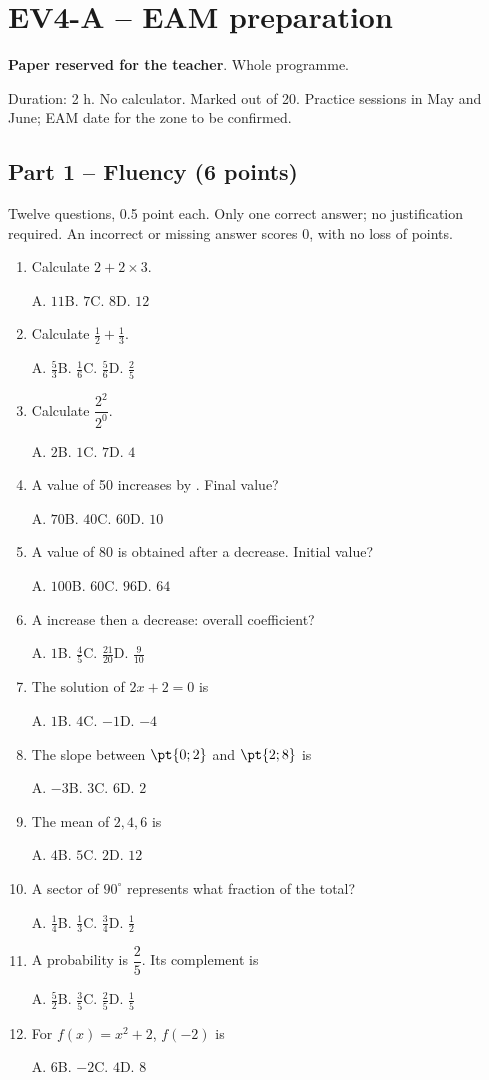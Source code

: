 \mxnewpage\section*{EV4-A -- EAM preparation}\label{EV4-A}
\textbf{Paper reserved for the teacher}. Whole programme.\par Duration: 2 h. No calculator. Marked out of 20. Practice sessions in May and June; EAM date for the zone to be confirmed.
\subsection*{Part 1 -- Fluency (6 points)}
Twelve questions, \num{0,5} point each. Only one correct answer; no justification required. An incorrect or missing answer scores 0, with no loss of points.
\begin{enumerate}
\item Calculate $2+2\times3$.\par A. $11$\quad B. $7$\quad C. $8$\quad D. $12$
\item Calculate $\frac12+\frac13$.\par A. $\frac{5}{3}$\quad B. $\frac{1}{6}$\quad C. $\frac{5}{6}$\quad D. $\frac{2}{5}$
\item Calculate $\dfrac{2^2}{2^{0}}$.\par A. $2$\quad B. $1$\quad C. $7$\quad D. $4$
\item A value of 50 increases by . Final value?\par A. $70$\quad B. $40$\quad C. $60$\quad D. $10$
\item A value of 80 is obtained after a  decrease. Initial value?\par A. $100$\quad B. $60$\quad C. $96$\quad D. $64$
\item A  increase then a  decrease: overall coefficient?\par A. $1$\quad B. $\frac{4}{5}$\quad C. $\frac{21}{20}$\quad D. $\frac{9}{10}$
\item The solution of $2x+2=0$ is\par A. $1$\quad B. $4$\quad C. $-1$\quad D. $-4$
\item The slope between $\pt{0;2}$ and $\pt{2;8}$ is\par A. $-3$\quad B. $3$\quad C. $6$\quad D. $2$
\item The mean of $2, 4, 6$ is\par A. $4$\quad B. $5$\quad C. $2$\quad D. $12$
\item A sector of $90^\circ$ represents what fraction of the total?\par A. $\frac{1}{4}$\quad B. $\frac{1}{3}$\quad C. $\frac{3}{4}$\quad D. $\frac{1}{2}$
\item A probability is $\dfrac{2}{5}$. Its complement is\par A. $\frac{5}{2}$\quad B. $\frac{3}{5}$\quad C. $\frac{2}{5}$\quad D. $\frac{1}{5}$
\item For $f(x)=x^2+2$, $f(-2)$ is\par A. $6$\quad B. $-2$\quad C. $4$\quad D. $8$
\end{enumerate}
